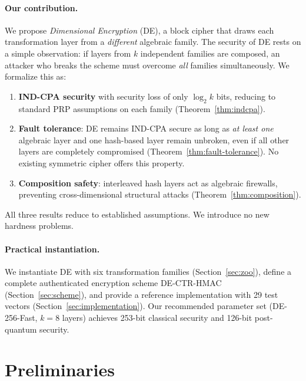 \documentclass[11pt]{article}
\newcommand{\DE}{\textsf{DE}}
\begin{document}
\paragraph{Our contribution.}
We propose \emph{Dimensional Encryption} (\DE), a block cipher that draws
each transformation layer from a \emph{different} algebraic family. The
security of \DE{} rests on a simple observation: if layers from $k$ independent
families are composed, an attacker who breaks the scheme must overcome
\emph{all} families simultaneously. We formalize this as:

\begin{enumerate}[leftmargin=*]
\item \textbf{IND-CPA security} with security loss of only $\log_2 k$ bits,
      reducing to standard PRP assumptions on each family
      (Theorem~\ref{thm:indcpa}).

\item \textbf{Fault tolerance}: \DE{} remains IND-CPA secure as long as
      \emph{at least one} algebraic layer and one hash-based layer remain
      unbroken, even if all other layers are completely compromised
      (Theorem~\ref{thm:fault-tolerance}). No existing symmetric cipher
      offers this property.

\item \textbf{Composition safety}: interleaved hash layers act as
      algebraic firewalls, preventing cross-dimensional structural attacks
      (Theorem~\ref{thm:composition}).
\end{enumerate}

All three results reduce to established assumptions. We introduce no new
hardness problems.

\paragraph{Practical instantiation.}
We instantiate \DE{} with six transformation families (Section~\ref{sec:zoo}),
define a complete authenticated encryption scheme DE-CTR-HMAC
(Section~\ref{sec:scheme}), and provide a reference implementation with
29 test vectors (Section~\ref{sec:implementation}). Our recommended
parameter set (DE-256-Fast, $k=8$ layers) achieves 253-bit classical
security and 126-bit post-quantum security.

\section{Preliminaries}
\label{sec:prelim}
\end{document}
